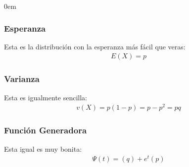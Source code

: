 \documentclass[12pt, fleqn]{report}                             %
\newenvironment{SmallIndentation}[1][0.75em]                    %
        {\begin{adjustwidth}{#1}{}\begin{footnotesize}}             %
        {\end{footnotesize}\end{adjustwidth}}                       %
\theoremstyle{break}                                            %
\begin{document}
\begin{multicols}{2}
\begin{SmallIndentation}[0em]
                    \subsubsection{Esperanza}

                        Esta es la distribución con la esperanza más fácil que veras:
                        \begin{align*}
                            E(X) = p
                        \end{align*}


                    \subsubsection{Varianza}

                        Esta es igualmente sencilla:
                        \begin{align*}
                            v(X) = p(1-p) = p - p^2 = pq
                        \end{align*}

                    \subsubsection{Función Generadora}

                        Esta igual es muy bonita:
                        \begin{align*}
                            \Psi(t) = (q) + e^t(p)
                        \end{align*}


                \end{SmallIndentation}
                \end{multicols}
\end{document}
